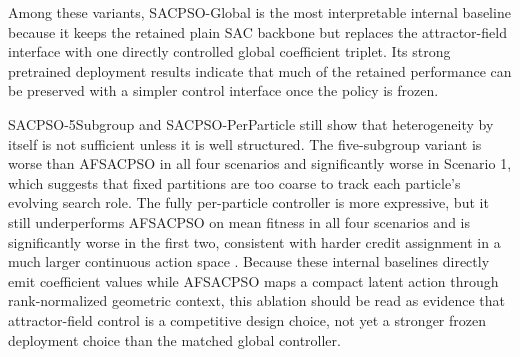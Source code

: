 \documentclass[final,5p,times]{elsarticle}
\begin{document}
Among these variants, SACPSO-Global is the most interpretable internal baseline because it keeps the retained plain SAC backbone but replaces the attractor-field interface with one directly controlled global coefficient triplet.
Its strong pretrained deployment results indicate that much of the retained performance can be preserved with a simpler control interface once the policy is frozen.

SACPSO-5Subgroup and SACPSO-PerParticle still show that heterogeneity by itself is not sufficient unless it is well structured.
The five-subgroup variant is worse than AFSACPSO in all four scenarios and significantly worse in Scenario 1, which suggests that fixed partitions are too coarse to track each particle's evolving search role.
The fully per-particle controller is more expressive, but it still underperforms AFSACPSO on mean fitness in all four scenarios and is significantly worse in the first two, consistent with harder credit assignment in a much larger continuous action space \cite{DulacArnold2015Deep, Zhou2020PLAS}.
Because these internal baselines directly emit coefficient values while AFSACPSO maps a compact latent action through rank-normalized geometric context, this ablation should be read as evidence that attractor-field control is a competitive design choice, not yet a stronger frozen deployment choice than the matched global controller.
\end{document}
